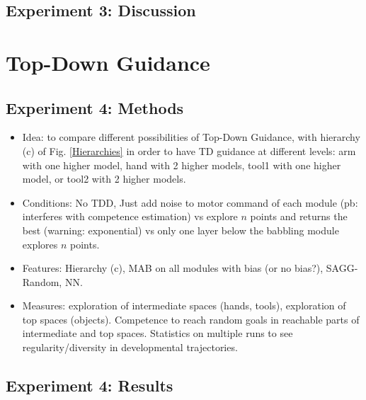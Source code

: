 \documentclass[conference]{include/IEEEtran}
\begin{document}
	\subsection{Experiment 3: Discussion}	
	
	
%
	
\section{Top-Down Guidance}


	\subsection{Experiment 4: Methods}	
		
		\begin{itemize}
			\item Idea: to compare different possibilities of Top-Down Guidance, with hierarchy (c) of Fig. \ref{Hierarchies} in order to have TD guidance at different levels: 
					arm with one higher model, hand with 2 higher models, tool1 with one higher model, or tool2 with 2 higher models.
			
			\item Conditions: No TDD, Just add noise to motor command of each module (pb: interferes with competence estimation) 
					vs explore $n$ points and returns the best (warning: exponential)
					vs only one layer below the babbling module explores $n$ points.
			
			\item Features: Hierarchy (c), MAB on all modules with bias (or no bias?), SAGG-Random, NN.
			
			\item Measures: exploration of intermediate spaces (hands, tools), exploration of top spaces (objects). Competence to reach random goals in reachable parts of intermediate and top spaces. 
					Statistics on multiple runs to see regularity/diversity in developmental trajectories.
		\end{itemize}
		
		
	\subsection{Experiment 4: Results}
	
\end{document}

